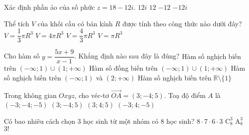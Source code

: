 \begin{ex}%
Xác định phần ảo của số phức   $z=18-12i$.
\choice
{ $12i$}
{ $12$}
{\True $-12$}
{$-12i$}
\end{ex}

\begin{ex}%
Thể tích $V$  của khối cầu có bán kính $R$  được tính theo công thức nào dưới đây?
\choice
{ $V=\dfrac{1}{3}\pi R^3$}
{ $V=4\pi R^3$}
{\True $V=\dfrac{4}{3}\pi R^3$}
{$V=\pi R^3$}
\end{ex}

\begin{ex}%
Cho hàm số  $y=\dfrac{5x+9}{x-1}$. Khẳng định nào sau đây là đúng?
\choice
{ Hàm số nghịch biến trên $(-\infty;1)\cup (1;+\infty)$}
{ Hàm số đồng biến trên $(-\infty;1)\cup (1;+\infty)$}
{\True Hàm số nghịch biến trên $(-\infty;1)$ và $(2;+\infty)$}
{Hàm số nghịch biến trên $\mathbb{R} \setminus \{1\}$}
\end{ex}

\begin{ex}%
Trong không gian  $Oxyz$, cho  véc-tơ  $\overrightarrow{OA}=(3;-4;5)$. Toạ độ điểm $A$ là
\choice
{ $(-3;-4;-5)$}
{\True $(3;-4;5)$}
{$(3;4;5)$}
{$(-3;4;-5)$}
\end{ex}

\begin{ex}%
Có bao nhiêu cách chọn $3$  học sinh từ một nhóm có  $8$  học sinh?
\choice
{ $8\cdot 7\cdot 6\cdot 3$}
{\True $\mathrm{C}_8^3$}
{$\mathrm{A}_8^3$}
{$3!$}
\end{ex}

